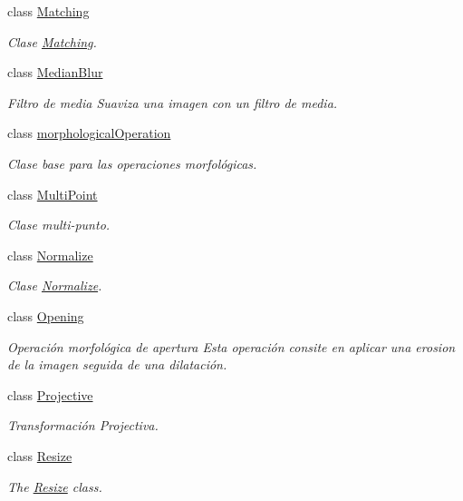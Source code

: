\begin{DoxyCompactItemize}
class \hyperlink{class_i3_d_1_1_matching}{Matching}
\begin{DoxyCompactList}\small\item\em Clase \hyperlink{class_i3_d_1_1_matching}{Matching}. \end{DoxyCompactList}\item 
class \hyperlink{class_i3_d_1_1_median_blur}{Median\+Blur}
\begin{DoxyCompactList}\small\item\em Filtro de media Suaviza una imagen con un filtro de media. \end{DoxyCompactList}\item 
class \hyperlink{class_i3_d_1_1morphological_operation}{morphological\+Operation}
\begin{DoxyCompactList}\small\item\em Clase base para las operaciones morfológicas. \end{DoxyCompactList}\item 
class \hyperlink{class_i3_d_1_1_multi_point}{Multi\+Point}
\begin{DoxyCompactList}\small\item\em Clase multi-\/punto. \end{DoxyCompactList}\item 
class \hyperlink{class_i3_d_1_1_normalize}{Normalize}
\begin{DoxyCompactList}\small\item\em Clase \hyperlink{class_i3_d_1_1_normalize}{Normalize}. \end{DoxyCompactList}\item 
class \hyperlink{class_i3_d_1_1_opening}{Opening}
\begin{DoxyCompactList}\small\item\em Operación morfológica de apertura Esta operación consite en aplicar una erosion de la imagen seguida de una dilatación. \end{DoxyCompactList}\item 
class \hyperlink{class_i3_d_1_1_projective}{Projective}
\begin{DoxyCompactList}\small\item\em Transformación Projectiva. \end{DoxyCompactList}\item 
class \hyperlink{class_i3_d_1_1_resize}{Resize}
\begin{DoxyCompactList}\small\item\em The \hyperlink{class_i3_d_1_1_resize}{Resize} class. \end{DoxyCompactList}\item 

\end{DoxyCompactItemize}
